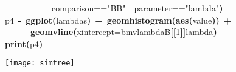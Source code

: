 \documentclass{elsarticle}
\makeatletter
\newcommand{\hlnumber}[1]{\textcolor[rgb]{0,0,0}{#1}}%
\newcommand{\hlfunctioncall}[1]{\textcolor[rgb]{.5,0,.33}{\textbf{#1}}}%
\newcommand{\hlstring}[1]{\textcolor[rgb]{.6,.6,1}{#1}}%
\newcommand{\hlkeyword}[1]{\textbf{#1}}%
\newcommand{\hlargument}[1]{\textcolor[rgb]{.69,.25,.02}{#1}}%
\newcommand{\hlassignement}[1]{\textbf{#1}}%
\newcommand{\hlsymbol}[1]{#1}%
\newcommand{\hlstd}[1]{\textcolor[rgb]{0,0,0}{#1}}%
\newenvironment{kframe}{%
 \def\FrameCommand##1{\hskip\@totalleftmargin \hskip-\fboxsep
 \colorbox{shadecolor}{##1}\hskip-\fboxsep
     \hskip-\linewidth \hskip-\@totalleftmargin \hskip\columnwidth}%
 \MakeFramed {\advance\hsize-\width
   \@totalleftmargin\z@ \linewidth\hsize
   \@setminipage}}%
 {\par\unskip\endMakeFramed}
\newenvironment{knitrout}{}{} %
\makeatother
\begin{document}
\begin{figure}
\begin{center}
\begin{knitrout}
{\begin{kframe}
\begin{flushleft}
\hlstd{}{\ }{\ }{\ }{\ }{\ }{\ }{\ }{\ }{\ }{\ }{\ }\hlsymbol{comparison}==\hlstring{"{}BB"{}}{\ }\hlkeyword{\usebox{\hlnormalsizeboxand}}{\ }\hlsymbol{parameter}==\hlstring{"{}lambda"{}}\hlkeyword{)}\hspace*{\fill}\\
\hlstd{}\hlsymbol{p4}{\ }\hlassignement{\usebox{\hlnormalsizeboxlessthan}-}{\ }\hlfunctioncall{ggplot}\hlkeyword{(}\hlsymbol{lambdas}\hlkeyword{)}{\ }\hlkeyword{+}{\ }\hlfunctioncall{geom\usebox{\hlnormalsizeboxunderscore}histogram}\hlkeyword{(}\hlfunctioncall{aes}\hlkeyword{(}\hlsymbol{value}\hlkeyword{)}\hlkeyword{)}{\ }\hlkeyword{+}\hspace*{\fill}\\
\hlstd{}{\ }{\ }{\ }{\ }{\ }{\ }\hlfunctioncall{geom\usebox{\hlnormalsizeboxunderscore}vline}\hlkeyword{(}\hlargument{xintercept}\hlargument{=}\hlsymbol{bm\usebox{\hlnormalsizeboxunderscore}v\usebox{\hlnormalsizeboxunderscore}lambda}\hlkeyword{\usebox{\hlnormalsizeboxdollar}}\hlsymbol{B}\hlkeyword{[[}\hlnumber{1}\hlkeyword{]}\hlkeyword{]}\hlkeyword{\usebox{\hlnormalsizeboxdollar}}\hlsymbol{lambda}\hlkeyword{)}\hspace*{\fill}\\
\hlstd{}\hlfunctioncall{print}\hlkeyword{(}\hlsymbol{p4}\hlkeyword{)}\mbox{}
\normalfont
\end{flushleft}


\centering{}\texttt{[image: simtree]} 

\end{kframe}}
\end{knitrout}

\end{center}
\label{fig:onec}
\end{figure}
\end{document}
